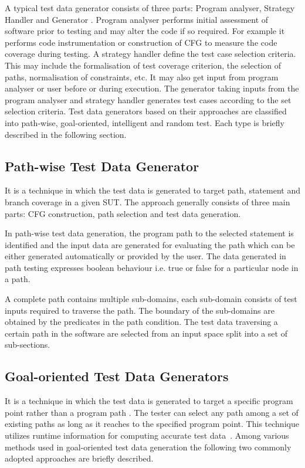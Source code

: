 A typical test data generator consists of three parts: Program analyser, Strategy Handler and Generator \cite{edvardsson1999survey}. Program analyser performs initial assessment of software prior to testing and may alter the code if so required. For example it performs code instrumentation or construction of CFG to measure the code coverage during testing. A strategy handler define the test case selection criteria. This may include the formalisation of test coverage criterion, the selection of paths, normalisation of constraints, etc. It may also get input from   program analyser or user before or during execution. The generator taking inputs from the program analyser and strategy handler generates test cases according to the set selection criteria.  Test data generators based on their approaches are classified into path-wise, goal-oriented, intelligent and random test. Each type is briefly described in the following section.

\subsection{Path-wise Test Data Generator}
It is a technique in which the test data is generated to target path, statement and branch coverage in a given SUT. The approach generally consists of three main parts: CFG construction, path selection and test data generation. 

In path-wise test data generation, the program path to the selected statement is identified and the input data are generated for evaluating the path which can be either generated automatically or provided by the user. The data generated in path testing expresses boolean behaviour i.e. true or false for a particular node in a path. 

A complete path contains multiple sub-domains, each sub-domain consists of test inputs required to traverse the path. The boundary of the sub-domains are obtained by the predicates in the path condition. The test data traversing a certain path in the software are selected from an input space split into a set of sub-sections. 



\subsection{Goal-oriented Test Data Generators}
It is a technique in which the test data is generated to target a specific program point rather than a program path \cite{chungautomated}. The tester can select any path among a set of existing paths as long as it reaches to the specified program point. This technique utilizes runtime information for computing accurate test data~\cite{ferguson1996chaining}. Among various methods used in goal-oriented test data generation the following two commonly adopted approaches are briefly described.

